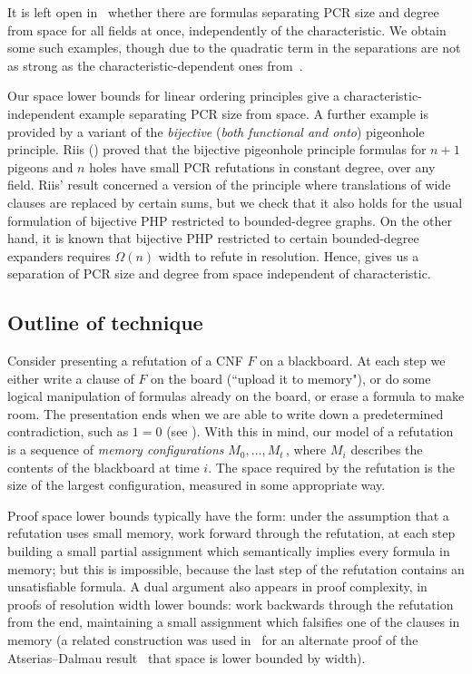 \documentclass{toc}
\begin{document}
\smallskip 
{}
It is left open in~\cite{DBLP:conf/icalp/FilmusLMNV13} whether there are formulas
separating PCR size and degree from space for all fields at once, independently of the characteristic. 
We obtain some such examples, though due to the quadratic term in 
the separations are not as strong as the characteristic-dependent ones from~\cite{DBLP:conf/icalp/FilmusLMNV13}.

Our space lower bounds for linear ordering principles give a characteristic-independent example separating PCR size from space.
A further example is provided by a variant of the \emph{bijective} (\emph{both functional and onto}) pigeonhole principle. 
Riis (\cite{riis,DBLP:conf/dlt/Razborov01}) proved that the bijective pigeonhole principle formulas for $n+1$ pigeons and $n$ holes 
have small PCR refutations in constant degree, over any field. Riis' result concerned a version of the principle 
where translations of wide clauses are replaced by certain sums, but we check that it also holds for the usual formulation
of bijective PHP restricted to bounded-degree graphs.
On the other hand, it is known that bijective PHP restricted to certain
bounded-degree expanders requires $\Omega(n)$ width to refute in resolution.  
Hence,  gives us a separation of PCR size and degree from space independent of characteristic.
 
\subsection{Outline of technique} 
\label{subsec:outline}

Consider presenting a refutation of a CNF $F$ on a blackboard.
At each step we either write a clause of $F$ on the board
(``upload it to memory"), or do some logical manipulation
of formulas already on the board, or erase a formula to 
make room. The presentation ends when we 
are able to write down a predetermined contradiction,
such as $1=0$ (see ).
With this in mind, our model of a refutation is a
sequence of \emph{memory configurations}
$M_0, \ldots, M_t$\,, where $M_i$ describes the contents
of the blackboard at time $i$. The space required
by the refutation is the size of the largest configuration,
measured in some appropriate way.

Proof space lower bounds  typically have the form:
under the assumption that a refutation uses small memory, 
 work forward through the refutation, 
at each step building a small partial assignment which semantically implies every formula in memory;
but this is impossible, because the last step of the refutation contains an unsatisfiable formula.  
A dual argument also appears in proof complexity, in proofs of resolution width lower bounds:
work backwards through the refutation from the end, 
maintaining a small assignment which falsifies one of the clauses 
in memory (a related construction was used in~\cite{DBLP:journals/tocl/FilmusLMNV15}
for an alternate proof of the Atserias--Dalmau
result~\cite{DBLP:journals/jcss/AtseriasD08} that space is lower bounded by width).
\end{document}
